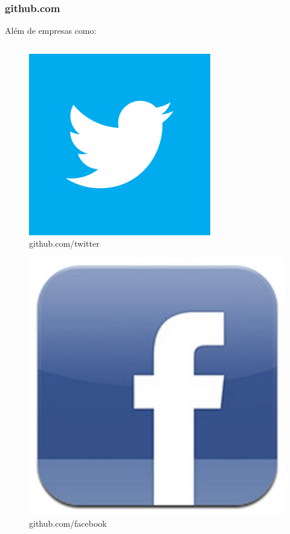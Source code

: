 \begin{frame}\frametitle{github.com}

Além de empresas como:

\begin{columns}

    \begin{column}{4cm}
        \begin{figure}
            \includegraphics[scale=0.2]{img/twitter.png}
            \caption{github.com/twitter}
        \end{figure}

        \begin{figure}
            \includegraphics[scale=0.1]{img/facebook.jpg}
            \caption{github.com/facebook}
        \end{figure}
    \end{column}


\end{columns}
\end{frame}
